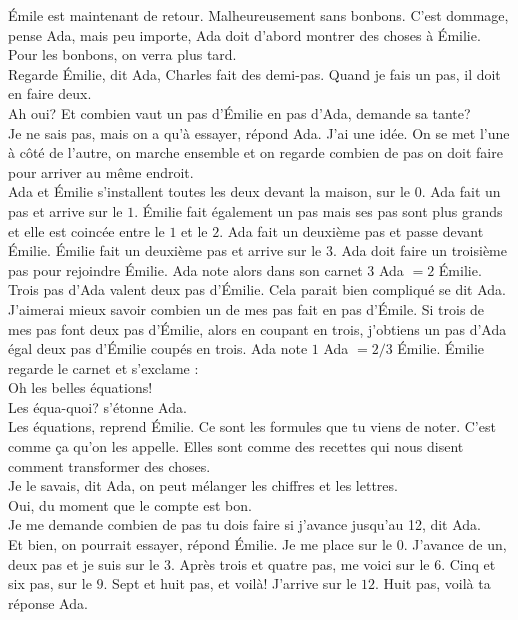 Émile est maintenant de retour. Malheureusement sans bonbons. C’est dommage, pense Ada, mais peu importe, Ada doit d’abord montrer des choses à Émilie. Pour les bonbons, on verra plus tard.\\
\guillemotleft Regarde Émilie, dit Ada, Charles fait des demi-pas. Quand je fais un pas, il doit en faire deux.\\
\mdash Ah oui? Et combien vaut un pas d’Émilie en pas d’Ada, demande sa tante?\\
\mdash Je ne sais pas, mais on a qu’à essayer, répond Ada. J’ai une idée. On se met l’une à côté de l’autre, on marche ensemble et on regarde combien de pas on doit faire pour arriver au même endroit.\guillemotright\\
Ada et Émilie s’installent toutes les deux devant la maison, sur le $0$. Ada fait un pas et arrive sur le $1$. Émilie fait également un pas mais ses pas sont plus grands et elle est coincée entre le $1$ et le $2$.
Ada fait un deuxième pas et passe devant Émilie. Émilie fait un deuxième pas et arrive sur le $3$.  Ada doit faire un troisième pas pour rejoindre Émilie.
Ada note alors dans son carnet $3$ Ada $= 2$ Émilie. Trois pas d’Ada valent deux pas d’Émilie. Cela parait bien compliqué se dit Ada. J’aimerai mieux savoir combien un de mes pas fait en pas d’Émile. Si trois de mes pas font deux pas d’Émilie, alors en coupant en trois, j'obtiens un pas d’Ada égal deux pas d’Émilie coupés en trois. Ada note $1$ Ada $= 2/3$ Émilie.
Émilie regarde le carnet et s’exclame : \\
\guillemotleft Oh les belles équations!\\
\mdash Les équa-quoi? s’étonne Ada.\\
\mdash Les équations, reprend Émilie. Ce sont les formules que tu viens de noter. C’est comme ça qu'on les appelle. Elles sont comme des recettes qui nous disent comment transformer des choses.\\
\mdash Je le savais, dit Ada, on peut mélanger les chiffres et les lettres.\\
\mdash Oui, du moment que le compte est bon.\\
\mdash Je me demande combien de pas tu dois faire si j’avance jusqu’au 12, dit Ada.\\
\mdash Et bien, on pourrait essayer, répond Émilie. Je me place sur le $0$. J’avance de un, deux pas et je suis sur le $3$. Après trois et quatre pas, me voici sur le $6$. Cinq et six pas, sur le $9$. Sept et huit pas, et voilà! J’arrive sur le $12$. Huit pas, voilà ta réponse Ada.\\
